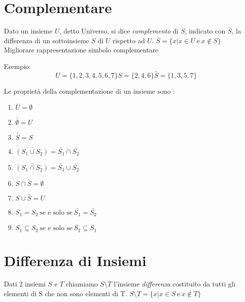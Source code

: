 \section{Complementare}
Dato un insieme $U$, detto Universo, si dice \textit{complemento} di $S$, indicato con $\bar{S}$,
la differenza di un sottoinsieme $S$ di $U$ rispetto ad $U$.\newline
$\bar{S} = \{x | x \in U \ \text{e} \ x \not \in S \} $
Migliorare rappresentazione simbolo complementare

Esempio:
\begin{equation*}
U = \{1,2,3,4,5,6,7\}
S = \{2,4,6\}
\bar{S} = \{1,3,5,7\}
\end{equation*}


\begin{prop}
    Le proprietà della complementazione di un insieme sono :
\end{prop}
\begin{enumerate}
  \item $\bar{U} = \emptyset $
  \item $\bar{\emptyset} = U$
  \item $\overline{\bar{S}} = S$
  \item $\overline{(S_1 \cup S_2)} = \bar{S_1} \cap \bar{S_2}$
  \item $\overline{(S_1 \cap S_2)} = \bar{S_1} \cup \bar{S_2}$
  \item $S \cap \bar{S} = \emptyset$
  \item $S \cup \bar{S} = U$
  \item $S_1 = S_2 \ \text{se e solo se} \ \bar{S_1} = \bar{S_2}$
  \item $S_1 \subseteq S_2 \ \text{se e solo se} \ \overline{S_2} \subseteq \overline{S_1}$
\end{enumerate}

\section{Differenza di Insiemi}
Dati 2 insiemi $S$ e $T$ chiamiamo $S \setminus T$ l'insieme \textit{differenza} costituito
da tutti gli elementi di S che non sono elementi di T. \newline
$S \setminus T = \{x | x \in S \ \text{e} \ x \not \in T\} $

